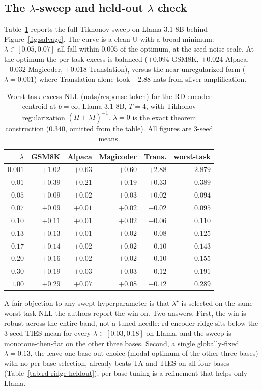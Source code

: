 \subsection{The $\lambda$-sweep and held-out $\lambda$ check}
\label{app:lambda-sweep}

Table~\ref{tab:rd-ridge-sweep} reports the full Tikhonov sweep on
Llama-3.1-8B behind Figure~\ref{fig:salvage}. The curve is a clean U
with a broad minimum: $\lambda \in [0.05, 0.07]$ all fall within
$0.005$ of the optimum, at the seed-noise scale. At the optimum the
per-task excess is balanced ($+0.094$ GSM8K, $+0.024$ Alpaca, $+0.032$
Magicoder, $+0.018$ Translation), versus the near-unregularized form
($\lambda = 0.001$) where Translation alone took $+2.88$ nats from
sliver amplification.

\begin{table}[h]
\centering
\caption{Worst-task excess NLL (nats/response token) for the
RD-encoder centroid at $b = \infty$, Llama-3.1-8B, $T = 4$, with
Tikhonov regularization $(\bar H + \lambda I)^{-1}$. $\lambda = 0$ is
the exact theorem construction ($0.340$, omitted from the table). All
figures are $3$-seed means.}
\label{tab:rd-ridge-sweep}
\begin{tabular}{rrrrrr}
\hline
$\lambda$ & GSM8K & Alpaca & Magicoder & Trans. & worst-task \\
\hline
$0.001$ & $+1.02$ & $+0.63$ & $+0.60$ & $+2.88$ & $\mathbf{2.879}$ \\
$0.01$  & $+0.39$ & $+0.21$ & $+0.19$ & $+0.33$ & $0.389$ \\
$0.05$  & $+0.09$ & $+0.02$ & $+0.03$ & $+0.02$ & $\mathbf{0.094}$ \\
$0.07$  & $+0.09$ & $+0.01$ & $+0.02$ & $-0.02$ & $0.095$ \\
$0.10$  & $+0.11$ & $+0.01$ & $+0.02$ & $-0.06$ & $0.110$ \\
$0.13$  & $+0.13$ & $+0.01$ & $+0.02$ & $-0.08$ & $0.125$ \\
$0.17$  & $+0.14$ & $+0.02$ & $+0.02$ & $-0.10$ & $0.143$ \\
$0.20$  & $+0.16$ & $+0.02$ & $+0.02$ & $-0.10$ & $0.155$ \\
$0.30$  & $+0.19$ & $+0.03$ & $+0.03$ & $-0.12$ & $0.191$ \\
$1.00$  & $+0.29$ & $+0.07$ & $+0.08$ & $-0.12$ & $0.289$ \\
\hline
\end{tabular}
\end{table}

A fair objection to any swept hyperparameter is that $\lambda^\star$
is selected on the same worst-task NLL the authors report the win on. Two
answers. First, the win is robust across the entire band, not a tuned
needle: rd-encoder ridge sits below the $3$-seed TIES mean for every
$\lambda \in [0.03, 0.18]$ on Llama, and the sweep is
monotone-then-flat on the other three bases. Second, a single
globally-fixed $\lambda = 0.13$, the leave-one-base-out choice
(modal optimum of the other three bases) with no per-base selection,
already beats TA and TIES on all four bases
(Table~\ref{tab:rd-ridge-heldout}); per-base tuning is a refinement
that helps only Llama.

